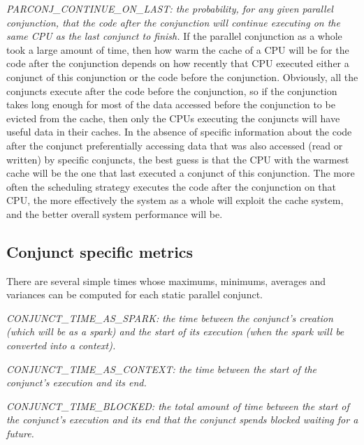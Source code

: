 \emph{PARCONJ\_CONTINUE\_ON\_LAST:
the probability, for any given parallel conjunction,
that the code after the conjunction
will continue executing on the same CPU
as the last conjunct to finish.}
If the parallel conjunction as a whole took a large amount of time,
then how warm the cache of a CPU will be
for the code after the conjunction
depends on how recently that CPU executed
either a conjunct of this conjunction or the code before the conjunction.
Obviously, all the conjuncts execute after the code before the conjunction,
so if the conjunction takes long enough for most of the data accessed
before the conjunction to 
be evicted from the cache,
then only the CPUs executing the conjuncts will have useful data in
their caches.
In the absence of specific information
about the code after the conjunct preferentially accessing data
that was also accessed (read or written) by specific conjuncts,
the best guess is that the CPU with the warmest cache
will be the one that last executed a conjunct of this conjunction.
The more often the scheduling strategy executes
the code after the conjunction on that CPU,
the more effectively the system as a whole will exploit the cache system,
and the better overall system performance will be.

\subsection{Conjunct specific metrics}

There are several simple times
whose maximums, minimums, averages and variances
can be computed for each static parallel conjunct.

\emph{CONJUNCT\_TIME\_AS\_SPARK:
the time between the conjunct's creation
(which will be as a spark) and the start of its execution
(when the spark will be converted into a context).}

\emph{CONJUNCT\_TIME\_AS\_CONTEXT:
the time between the start of the conjunct's execution and its end.}

\emph{CONJUNCT\_TIME\_BLOCKED:
the total amount of time
between the start of the conjunct's execution and its end
that the conjunct spends blocked waiting for a future.}


